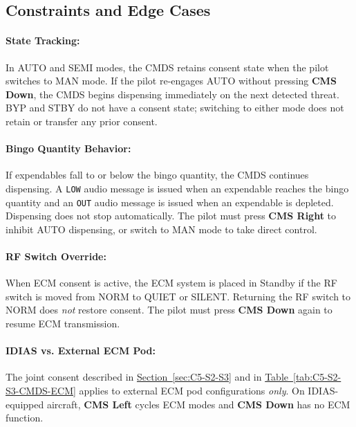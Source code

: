 \documentclass[11pt, a4paper, twoside]{report}
\newcommand{\secref}[1]{\hyperref[#1]{Section~\ref*{#1}}}
\newcommand{\tabref}[1]{\hyperref[#1]{Table~\ref*{#1}}}
\begin{document}
\subsection{Constraints and Edge Cases}
\label{sec:C5-S2-S4}

\paragraph{State Tracking:}

In AUTO and SEMI modes, the CMDS retains consent state when the pilot switches to MAN mode. If the pilot re-engages AUTO without pressing \textbf{CMS Down}, the CMDS begins dispensing immediately on the next detected threat. BYP and STBY do not have a consent state; switching to either mode does not retain or transfer any prior consent.

\paragraph{Bingo Quantity Behavior:}

If expendables fall to or below the bingo quantity, the CMDS continues dispensing. A \texttt{LOW} audio message is issued when an expendable reaches the bingo quantity and an \texttt{OUT} audio message is issued when an expendable is depleted. Dispensing does not stop automatically. The pilot must press \textbf{CMS Right} to inhibit AUTO dispensing, or switch to MAN mode to take direct control.

\paragraph{RF Switch Override:}

When ECM consent is active, the ECM system is placed in Standby if the RF switch is moved from NORM to QUIET or SILENT. Returning the RF switch to NORM does \textit{not} restore consent. The pilot must press \textbf{CMS Down} again to resume ECM transmission.

\paragraph{IDIAS vs. External ECM Pod:}

The joint consent described in \secref{sec:C5-S2-S3} and in \tabref{tab:C5-S2-S3-CMDS-ECM} applies to external ECM pod configurations \textit{only}. On IDIAS-equipped aircraft, \textbf{CMS Left} cycles ECM modes and \textbf{CMS Down} has no ECM function.
\end{document}
